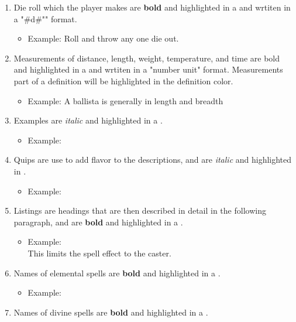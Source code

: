 \begin{enumerate}[leftmargin=12pt]
\item Die roll which the player makes are \textbf{bold} and highlighted in a   and wrtiten in a "\#d\#"" format.
	\begin{itemize}\item Example: Roll  and throw any one die out.\end{itemize}
\item Measurements of distance, length, weight, temperature, and time are bold and highlighted in   a and wrtiten in a "number unit" format. Measurements part of a definition will be highlighted in the definition color.
	\begin{itemize}\item Example: A ballista is generally  in length and breadth\end{itemize}
\item Examples are \textit{italic} and highlighted in a .
	\begin{itemize}\item Example: \end{itemize}
\item Quips are use to add flavor to the descriptions, and are \textit{italic} and highlighted in .
	\begin{itemize}\item Example: \end{itemize}
\item Listings are headings that are then described in detail in the following paragraph, and are \textbf{bold} and highlighted in a .
	\begin{itemize}\item Example: \\
	This limits the spell effect to the caster.\end{itemize}
\item Names of elemental spells are \textbf{bold} and highlighted in a .
	\begin{itemize}\item Example: \end{itemize}
\item Names of divine spells are \textbf{bold} and highlighted in a .

\end{enumerate}
